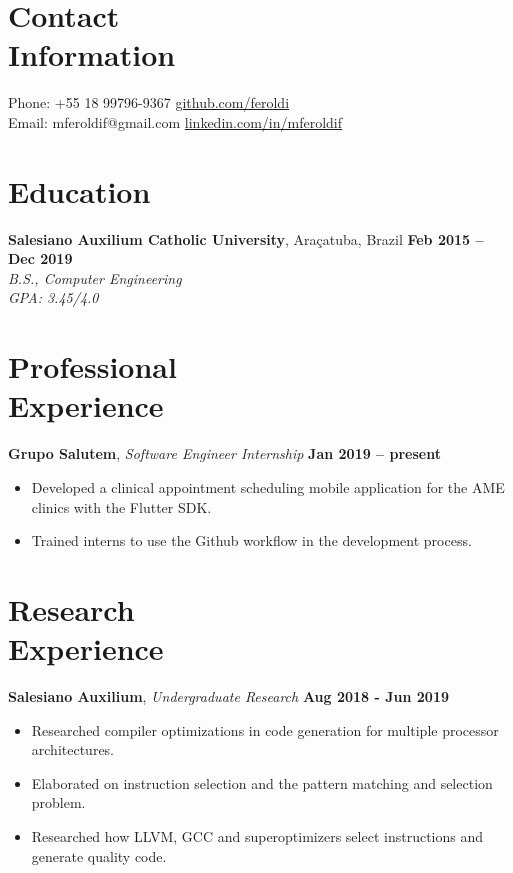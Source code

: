 \documentclass[margin,line]{resume}
\begin{document}
\begin{resume}
    \section{\mysidestyle Contact\\Information}

    Phone: +55 18 99796-9367 \hfill \url{github.com/feroldi}\\
    \noindent Email: mferoldif@gmail.com \hfill \url{linkedin.com/in/mferoldif}

    \section{\mysidestyle Education}

    \textbf{Salesiano Auxilium Catholic University}, Araçatuba, Brazil \hfill \textbf{Feb 2015 -- Dec 2019}\\
    \textsl{B.S., Computer Engineering}\\
    \textsl{GPA: 3.45/4.0}

    \section{\mysidestyle Professional\\Experience}

    \textbf{Grupo Salutem}, \textit{Software Engineer Internship} \hfill \textbf{Jan 2019 -- present}
    \begin{itemize}
        \item Developed a clinical appointment scheduling mobile application for the AME clinics with the Flutter SDK.
        \item Trained interns to use the Github workflow in the development process.
    \end{itemize}

    \section{\mysidestyle Research\\Experience}

    \textbf{Salesiano Auxilium}, \textsl{Undergraduate Research} \hfill \textbf{Aug 2018 - Jun 2019}
    \begin{itemize}
        \item Researched compiler optimizations in code generation for multiple processor architectures.
        \item Elaborated on instruction selection and the pattern matching and selection problem.
        \item Researched how LLVM, GCC and superoptimizers select instructions and generate quality code.
    \end{itemize}


\end{resume}
\end{document}
